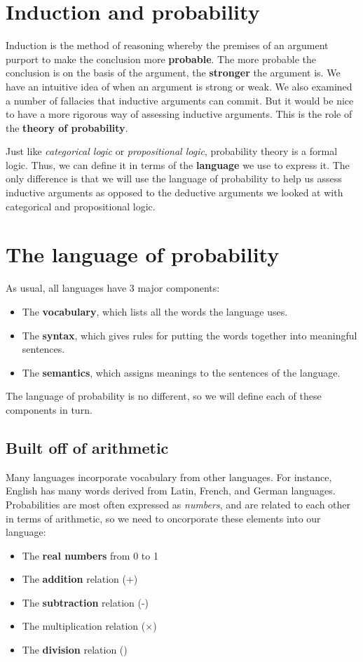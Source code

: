 \documentclass[letterpaper,10pt]{article}
\begin{document}
\section{Induction and probability}

Induction is the method of reasoning whereby the premises of an argument purport to make the conclusion more \textbf{probable}.  The more probable the conclusion is on the basis of the argument, the \textbf{stronger} the argument is.  We have an intuitive idea of when an argument is strong or weak.  We also examined a number of fallacies that inductive arguments can commit.  But it would be nice to have a more rigorous way of assessing inductive arguments.  This is the role of the \textbf{theory of probability}.

Just like \textit{categorical logic} or \textit{propositional logic}, probability theory is a formal logic.  Thus, we can define it in terms of the \textbf{language} we use to express it.  The only difference is that we will use the language of probability to help us assess inductive arguments as opposed to the deductive arguments we looked at with categorical and propositional logic.

\section{The language of probability}

As usual, all languages have 3 major components:
\begin{itemize}
	\item The \textbf{vocabulary}, which lists all the words the language uses.
	\item The \textbf{syntax}, which gives rules for putting the words together into meaningful sentences.
	\item The \textbf{semantics}, which assigns meanings to the sentences of the language.
\end{itemize}

The language of probability is no different, so we will define each of these components in turn.

\subsection{Built off of arithmetic}

Many languages incorporate vocabulary from other languages.  For instance, English has many words derived from Latin, French, and German languages. Probabilities are most often expressed as \textit{numbers}, and are related to each other in terms of arithmetic, so we need to oncorporate these elements into our language:
\begin{itemize}
	\item The \textbf{real numbers} from 0 to 1
	\item The \textbf{addition} relation (+)
	\item The \textbf{subtraction} relation (-)
	\item The multiplication relation ($\times$)
	\item The \textbf{division} relation ()
\end{itemize}
\end{document}
